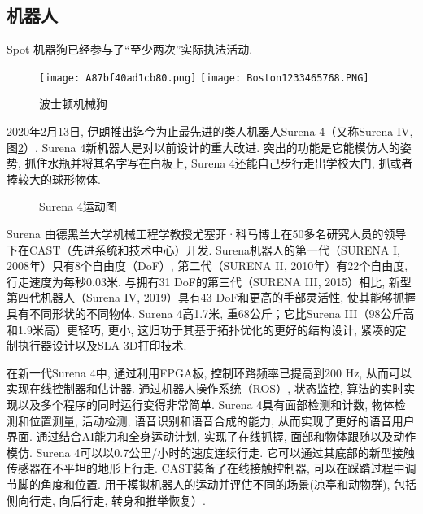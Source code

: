 \subsection{\textbf{机器人}}
Spot 机器狗已经参与了“至少两次”实际执法活动.
\begin{figure}[H]
	\centering
	\texttt{[image: A87bf40ad1cb80.png]}
	\texttt{[image: Boston1233465768.PNG]}
	\caption{波士顿机械狗}
   \label{AI:7bf40ad1cb80Fig4}
\end{figure}

2020年2月13日, 伊朗推出迄今为止最先进的类人机器人Surena 4（又称Surena IV, 图\ref{SurenaIVFig2}）.
Surena 4新机器人是对以前设计的重大改进. 突出的功能是它能模仿人的姿势, 抓住水瓶并将其名字写在白板上, Surena 4还能自己步行走出学校大门, 抓或者捧较大的球形物体.
\begin{figure}[H]
\centering
{}
\caption{Surena 4运动图}
\label{SurenaIVFig2}
\end{figure}
Surena 由德黑兰大学机械工程学教授尤塞菲·科马博士在50多名研究人员的领导下在CAST（先进系统和技术中心）开发.
Surena机器人的第一代（SURENA I, 2008年）只有8个自由度（DoF）, 第二代（SURENA II, 2010年）有22个自由度, 行走速度为每秒0.03米.
与拥有31 DoF的第三代（SURENA III, 2015）相比, 新型第四代机器人（Surena IV, 2019）具有43 DoF和更高的手部灵活性, 使其能够抓握具有不同形状的不同物体.
Surena 4高1.7米, 重68公斤；它比Surena III（98公斤高和1.9米高）更轻巧, 更小, 这归功于其基于拓扑优化的更好的结构设计, 紧凑的定制执行器设计以及SLA 3D打印技术.

在新一代Surena 4中, 通过利用FPGA板, 控制环路频率已提高到200 Hz, 从而可以实现在线控制器和估计器. 通过机器人操作系统（ROS）, 状态监控, 算法的实时实现以及多个程序的同时运行变得非常简单.
Surena 4具有面部检测和计数, 物体检测和位置测量, 活动检测, 语音识别和语音合成的能力, 从而实现了更好的语音用户界面. 通过结合AI能力和全身运动计划, 实现了在线抓握, 面部和物体跟随以及动作模仿.
Surena 4可以以0.7公里/小时的速度连续行走. 它可以通过其底部的新型接触传感器在不平坦的地形上行走.
CAST装备了在线接触控制器, 可以在踩踏过程中调节脚的角度和位置.
用于模拟机器人的运动并评估不同的场景(凉亭和动物群), 包括侧向行走, 向后行走, 转身和推举恢复）.
